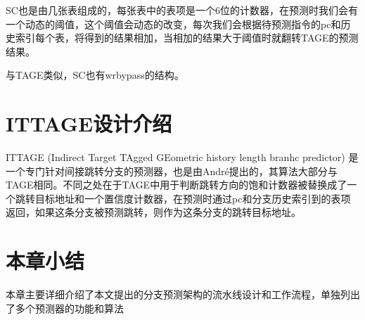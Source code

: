 SC也是由几张表组成的，每张表中的表项是一个6位的计数器，在预测时我们会有一个动态的阈值，这个阈值会动态的改变，每次我们会根据待预测指令的pc和历史索引每个表，将得到的结果相加，当相加的结果大于阈值时就翻转TAGE的预测结果。

与TAGE类似，SC也有wrbypass的结构。

\section{ITTAGE设计介绍}

ITTAGE (Indirect Target TAgged GEometric history length branhc predictor) 是一个专门针对间接跳转分支的预测器，也是由André提出的，其算法大部分与TAGE相同。不同之处在于TAGE中用于判断跳转方向的饱和计数器被替换成了一个跳转目标地址和一个置信度计数器，在预测时通过pc和分支历史索引到的表项返回，如果这条分支被预测跳转，则作为这条分支的跳转目标地址。

\section{本章小结}

本章主要详细介绍了本文提出的分支预测架构的流水线设计和工作流程，单独列出了多个预测器的功能和算法